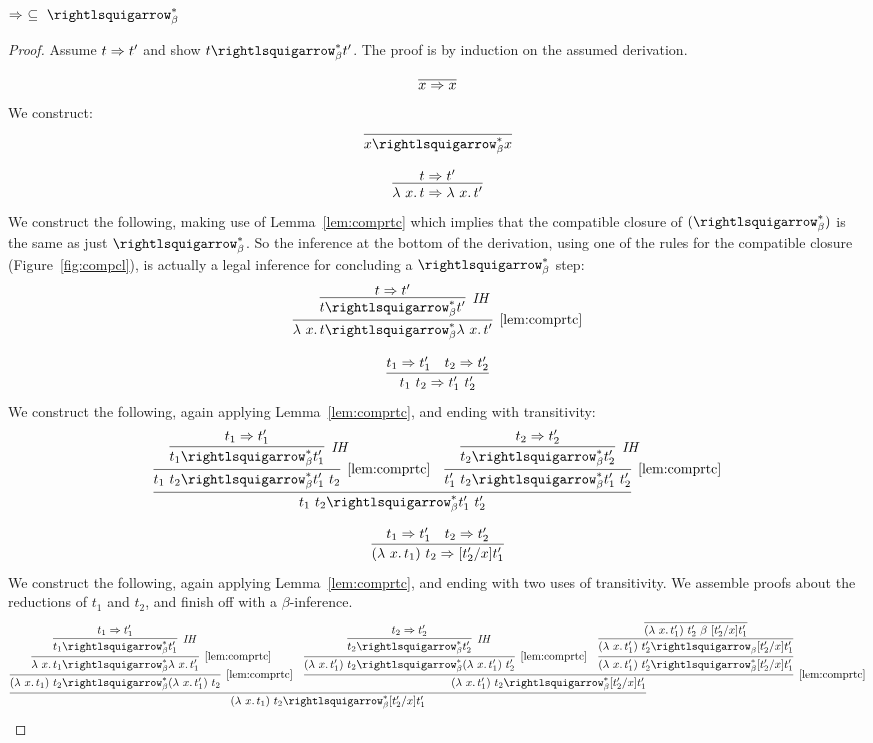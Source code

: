 \begin{lemma}
  \label{lem:predmbeta}
  $\Pred\ \subseteq\ \betaa_\beta^*$
\end{lemma}
\begin{proof}
  Assume $t \Rightarrow t'$ and show $t \betaa_\beta^* t'$.  The proof is by induction on the assumed
  derivation.

  \case{ }
  \[
  \predvar
  \]
  \noindent We construct:
  \[
  \infer{x \betaa_\beta^* x}{\ }
  \]

  \case{ }
  \[
  \predlam
  \]
  \noindent We construct the following, making use of
  Lemma~\ref{lem:comprtc} which implies that the compatible closure of $(\betaa_\beta^*)$
  is the same as just $\betaa_\beta^*$. So the inference at the bottom of the
  derivation, using one of the rules for the compatible closure
  (Figure~\ref{fig:compcl}), is actually a legal inference for
  concluding a $\betaa_\beta^*$ step:
  \[
  \infer[\ref{lem:comprtc}]{\lam{x}{t} \betaa_\beta^* \lam{x}{t'}}
    {\infer[\textit{IH}]{t \betaa_\beta^* t'}{t \Pred t'}}
    \]

    \case{ }
    \[
    \predapp
    \]
    \noindent We construct the following, again applying Lemma~\ref{lem:comprtc}, and ending with transitivity:
    \[
    \infer{t_1\ t_2 \betaa_\beta^* t_1'\ t_2'}
          {\infer[\ref{lem:comprtc}]{t_1\ t_2 \betaa_\beta^* t_1'\ t_2}{\infer[\textit{IH}]{t_1 \betaa_\beta^* t_1'}{t_1 \Pred t_1'}} &
           \infer[\ref{lem:comprtc}]{t_1'\ t_2 \betaa_\beta^* t_1'\ t_2'}{\infer[\textit{IH}]{t_2 \betaa_\beta^* t_2'}{t_2 \Pred t_2'}}}
          \]

    \case{ }
    \[
    \predbeta
    \]
    \noindent We construct the following, again applying Lemma~\ref{lem:comprtc}, and ending with two uses of transitivity.  We assemble proofs about the reductions of $t_1$ and $t_2$, and finish off with a $\beta$-inference.
    \[
    \infer{(\lam{x}{t_1})\ t_2 \betaa_\beta^* [t_2'/x]t_1'}
          {\infer[\ref{lem:comprtc}]{(\lam{x}{t_1})\ t_2 \betaa_\beta^* (\lam{x}{t_1'})\ t_2}
                {\infer[\ref{lem:comprtc}]{\lam{x}{t_1} \betaa_\beta^* \lam{x}{t_1'}}{\infer[\textit{IH}]{t_1 \betaa_\beta^* t_1'}{t_1 \Pred t_1'}}} &
                \infer[\ref{lem:comprtc}]{(\lam{x}{t_1'})\ t_2 \betaa_\beta^* [t_2'/x]t_1'}
                      {\infer[\ref{lem:comprtc}]{(\lam{x}{t_1'})\ t_2 \betaa_\beta^* (\lam{x}{t_1'})\ t_2'}
                        {\infer[\textit{IH}]{t_2 \betaa_\beta^* t_2'}{t_2 \Pred t_2'}}
                     & \infer{(\lam{x}{t_1'})\ t_2' \betaa_\beta^* [t_2'/x]t_1'}{\infer{(\lam{x}{t_1'})\ t_2' \betaa_\beta [t_2'/x]t_1'}{\infer{(\lam{x}{t_1'})\ t_2' \ \beta\  [t_2'/x]t_1'}{\ }}}}}
          \]

          
\end{proof}


